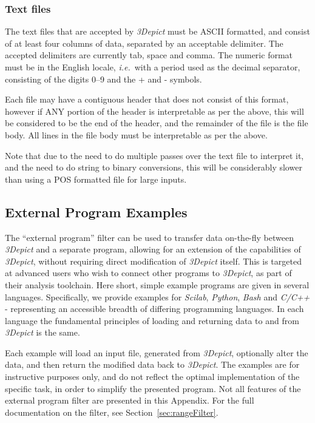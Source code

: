 \documentclass[10pt]{article}
\begin{document}
\subsubsection{Text files}
\label{sec:textformat}
The text files that are accepted by \emph{3Depict} must be ASCII formatted, and consist of at least four columns of data, separated by an acceptable delimiter. The accepted delimiters are currently tab, space and comma. The numeric format must be in the English locale, \emph{i.e.}\ with a period used as the decimal separator, consisting of the digits 0--9 and the + and - symbols.

Each file may have a contiguous header that does not consist of this format, however if ANY portion of the header is interpretable as per the above, this will be considered to be the end of the header, and the remainder of the file is the file body. All lines in the file body must be interpretable as per the above.  

Note that due to the need to do multiple passes over the text file to interpret it, and the need to do string to binary conversions, this will be considerably slower than using a POS formatted file for large inputs.



\subsection{External Program Examples}
\label{sec:externalProgExample}
The ``external program'' filter can be used to transfer data on-the-fly between \emph{3Depict} and a separate program, allowing for an extension of the capabilities of \emph{3Depict}, without requiring direct modification of \emph{3Depict} itself. This is targeted at advanced users who wish to connect other programs to \emph{3Depict}, as part of their analysis toolchain. Here short, simple example programs are given in several languages. Specifically, we provide examples for  \emph{Scilab}, \emph{Python}, \emph{Bash} and \emph{C/C++} - representing an accessible breadth of differing programming languages. In each language the fundamental principles of loading and returning data to and from \emph{3Depict} is the same.

Each example will load an input file, generated from \emph{3Depict}, optionally alter the data, and then return the modified data back to \emph{3Depict}. The examples are for instructive purposes only, and do not reflect the optimal implementation of the specific task, in order to simplify the presented program. Not all features of the external program filter are presented in this Appendix. For the full documentation on the filter, see Section~\ref{sec:rangeFilter}.
\end{document}
